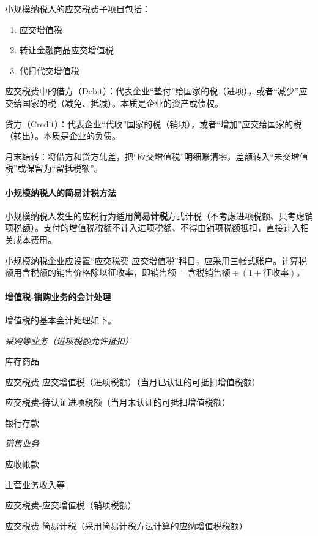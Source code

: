 \documentclass[UTF8,12pt]{ctexart}
\newenvironment{Dr}{%
	\begin{list}{}%
		{
			\setlength{\leftmargin}{2em}
			\setlength{\labelwidth}{2em}
			\setlength{\labelsep}{0pt}
			\setlength{\itemindent}{0pt}
			\setlength{\listparindent}{0pt}
			\setlength{\parsep}{0pt}
			\setlength{\topsep}{0pt}
		}
		\item[\textbf{借：}]
	}{%
	\end{list}
}
\newenvironment{Cr}{%
	\begin{list}{}%
		{
			\setlength{\leftmargin}{3em}
			\setlength{\labelwidth}{2em}
			\setlength{\labelsep}{0pt}
			\setlength{\itemindent}{0pt}
			\setlength{\listparindent}{0pt}
			\setlength{\parsep}{0pt}
			\setlength{\topsep}{0pt}
		}
		\item[\textbf{贷：}]
	}{%
	\end{list}
}
\numberwithin{equation}{section} %
\numberwithin{figure}{section}
\numberwithin{table}{section}
\begin{document}
	小规模纳税人的应交税费子项目包括：
	\begin{enumerate}
		\item 应交增值税
		
		\item 转让金融商品应交增值税
		
		\item 代扣代交增值税
	\end{enumerate}
	
	应交税费中的借方（Debit）：代表企业“垫付”给国家的税（进项），或者“减少”应交给国家的税（减免、抵减）。本质是企业的资产或债权。
	
	贷方（Credit）：代表企业“代收”国家的税（销项），或者“增加”应交给国家的税（转出）。本质是企业的负债。
	
	月末结转：将借方和贷方轧差，把“应交增值税”明细账清零，差额转入“未交增值税”或保留为“留抵税额”。
	
	\paragraph{小规模纳税人的简易计税方法}
	小规模纳税人发生的应税行为适用\textbf{简易计税}方式计税（不考虑进项税额、只考虑销项税额）。支付的增值税税额不计入进项税额、不得由销项税额抵扣，直接计入相关成本费用。
	
	小规模纳税企业应设置“应交税费-应交增值税”科目，应采用三帐式账户。计算税额用含税额的销售价格除以征收率，即$\text{销售额} = \text{含税销售额} \div (1+\text{征收率})$。
	
	\paragraph{增值税-销购业务的会计处理}
	增值税的基本会计处理如下。
	
	\textit{采购等业务（进项税额允许抵扣）}
	
	\begin{Dr}
		库存商品
		
		应交税费-应交增值税（进项税额）（当月已认证的可抵扣增值税额）
		
		应交税费-待认证进项税额（当月未认证的可抵扣增值税额）
	\end{Dr}
	\begin{Cr}
		银行存款
	\end{Cr}
	
	\textit{销售业务}
	
	\begin{Dr}
		应收帐款
	\end{Dr}
	\begin{Cr}
		主营业务收入等
		
		应交税费-应交增值税（销项税额）
		
		应交税费-简易计税（采用简易计税方法计算的应纳增值税税额）
	\end{Cr}
	
\end{document}
